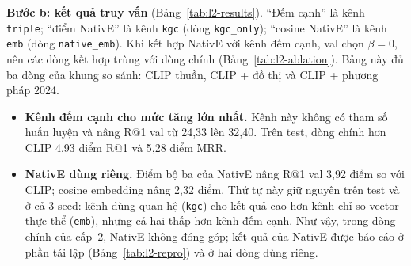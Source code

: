 \begin{table}[t]
\centering
\caption{Kết quả truy vấn trên MKG-W (892 truy vấn mỗi split, pool 892 ảnh). $\alpha,\beta$ chọn trên val; test chấm một lần.
Hai dòng NativE dùng riêng tín hiệu của NativE ($\beta = 1$).}
\label{tab:l2-results}
\footnotesize
\setlength{\tabcolsep}{2.5pt}
\end{table}

\textbf{Bước b: kết quả truy vấn} (Bảng~\ref{tab:l2-results}). ``Đếm cạnh'' là kênh \texttt{triple}; ``điểm NativE'' là kênh
\texttt{kgc} (dòng \texttt{kgc\_only}); ``cosine NativE'' là kênh \texttt{emb} (dòng \texttt{native\_emb}). Khi kết hợp
NativE với kênh đếm cạnh, val chọn $\beta = 0$, nên các dòng kết hợp trùng với dòng chính (Bảng~\ref{tab:l2-ablation}). Bảng
này đủ ba dòng của khung so sánh: CLIP thuần, CLIP + đồ thị và CLIP + phương pháp 2024.
\begin{itemize}
\item \textbf{Kênh đếm cạnh cho mức tăng lớn nhất.} Kênh này không có tham số huấn luyện và nâng R@1 val từ 24,33 lên 32,40.
Trên test, dòng chính hơn CLIP 4,93 điểm R@1 và 5,28 điểm MRR.
\item \textbf{NativE dùng riêng.} Điểm bộ ba của NativE nâng R@1 val 3,92 điểm so với CLIP; cosine embedding nâng 2,32 điểm.
Thứ tự này giữ nguyên trên test và ở cả 3 seed: kênh dùng quan hệ (\texttt{kgc}) cho kết quả cao hơn kênh chỉ so vector thực
thể (\texttt{emb}), nhưng cả hai thấp hơn kênh đếm cạnh. Như vậy, trong dòng chính của cấp~2, NativE không đóng góp; kết quả
của NativE được báo cáo ở phần tái lập (Bảng~\ref{tab:l2-repro}) và ở hai dòng dùng riêng.
\end{itemize}

